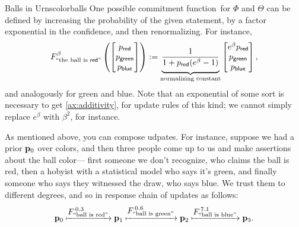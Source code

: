 \documentclass{article}
\def\cofunc{commitment function}
\begin{document}
\begin{examplex}{Balls in Urns}{colorballs}
    One possible \cofunc\ for $\Phi$ and $\Theta$ can be defined by increasing the probability of the given statement, by a factor exponential in the confidence, and then renormalizing.
    For instance,
    \[
        F^{\beta}_{\text{``the ball is ${\mathsf{red}}$''}} \left(
            \begin{bmatrix} p_{\mathsf{red}} \\ p_{\mathsf{green}} \\ p_{\mathsf{blue}} \\ \end{bmatrix}
        \right) :=
            \underbrace{\vphantom{\Bigg|}
                \frac{1}{1 + p_{\mathsf{red}} (e^{\beta} - 1) }
            }_{\text{normalizing constant}}
            \begin{bmatrix}
                e^\beta  p_{\mathsf{red}} \\
                p_{\mathsf{green}}  \\
                p_{\mathsf{blue}}
            \end{bmatrix},
    \]
    and analogously for green and blue.
    Note that an exponential of some sort is necessary to get \cref{ax:additivity}, for update rules of this kind; we cannot simply replace
    $e^{\beta}$ with $\beta^2$, for instance.

    As mentioned above, you can compose udpates. For instance, suppose we had a prior $\mathbf{p}_0$ over colors, and then three people come up to us and make assertions about the ball color---%
    first someone we don't recognize, who claims the ball is red, then a hobyist with a statistical model who says it's green, and finally someone who says they witnessed the draw, who says blue.
    We trust them to different degrees, and so in response  chain of updates as follows:
    \[
        \mathbf{p}_0
            \xmapsto{\displaystyle F^{\,0.3}_{\text{``ball is red''}}}
        \mathbf{p}_1
            \xmapsto{\displaystyle F^{\,0.6}_{\text{``ball is green''}}}
        \mathbf{p}_2
            \xmapsto{\displaystyle F^{\,7.1}_{\text{``ball is blue''}}}
        \mathbf{p}_3.
    \]


\end{examplex}
\end{document}

